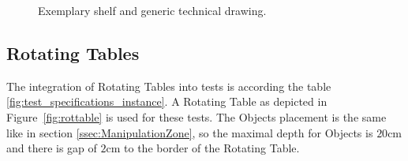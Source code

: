 \begin{figure}[h!]
	\centering
	\hspace{0.05\textwidth}
	\caption{Exemplary shelf and generic technical drawing.}%
	\label{fig:shelf}
\end{figure}


\subsection{Rotating Tables}\label{sec:Rotating Table}
The integration of Rotating Tables into tests is according the table \ref{fig:test_specifications_instance}.  A Rotating Table as depicted in Figure~\ref{fig:rottable} is used for these tests. The Objects placement is the same like in section \ref{ssec:ManipulationZone}, so the maximal depth for Objects is $20 \si{\centi\meter}$ and there is gap of $2\si{\centi\meter}$ to the border of the Rotating Table.



